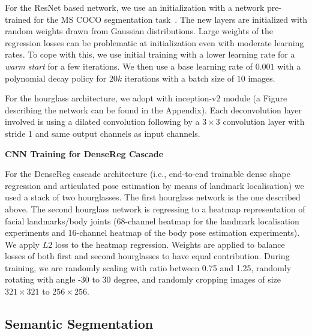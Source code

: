 For the ResNet based network, we use an initialization with a network pre-trained for the MS COCO segmentation task~\citep{lin2014microsoft}. The new layers are initialized with random weights drawn from Gaussian distributions. Large weights of the regression losses can be problematic at initialization even with moderate learning rates. To cope with this, we use initial training with a lower learning rate for a \textit{warm start} for a few iterations. We then use a base learning rate of $0.001$ with a polynomial decay policy for $20k$ iterations with a batch size of $10$ images.

For the hourglass architecture, we adopt \cite{newell2016stacked} with inception-v2 module (a Figure describing the network can be found in the Appendix). Each deconvolution layer involved is using a dilated convolution following by a $3\times 3$ convolution layer with stride 1 and same output channels as input channels. 


\textbf{CNN Training for DenseReg Cascade} 

For the DenseReg cascade architecture (i.e., end-to-end trainable dense shape regression and articulated pose estimation by means of landmark localisation) we used a stack of two hourglasses. The first hourglass network is the one described above. The second hourglass network is regressing to a  heatmap representation of facial landmarks/body joints (68-channel heatmap for the landmark localisation experiments and 16-channel heatmap of the body pose estimation experiments). We apply $L2$ loss to the heatmap regression. Weights are applied to balance losses of both first and second hourglasses to have equal contribution. During training, we are randomly scaling with ratio between 0.75 and 1.25, randomly rotating with angle -30 to 30 degree, and randomly cropping images of size $321\times321$ to $256\times256$.

\subsection{Semantic Segmentation}
\label{sec:exp_semantic_segmentation}

